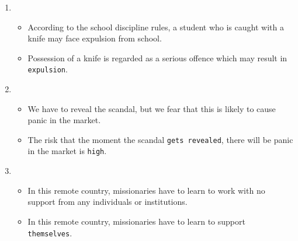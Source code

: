 \documentclass[a4paper]{article}
\begin{document}
\begin{enumerate}
\begin{itemize}
    \end{itemize}
    \item \begin{itemize}
        \item According to the school discipline rules, a student who is caught with a knife may face expulsion from school.
        \item Possession of a knife is regarded as a serious offence which may result in {\tt expulsion}.
    \end{itemize}
    \item \begin{itemize}
        \item We have to reveal the scandal, but we fear that this is likely to cause panic in the market.
        \item The risk that the moment the scandal {\tt gets revealed}, there will be panic in the market is {\tt high}.
    \end{itemize}
    \item \begin{itemize}
        \item In this remote country, missionaries have to learn to work with no support from any individuals or institutions.
        \item In this remote country, missionaries have to learn to support\\{\tt themselves}.
    \end{itemize}
\end{enumerate}
\pagebreak
\end{document}
